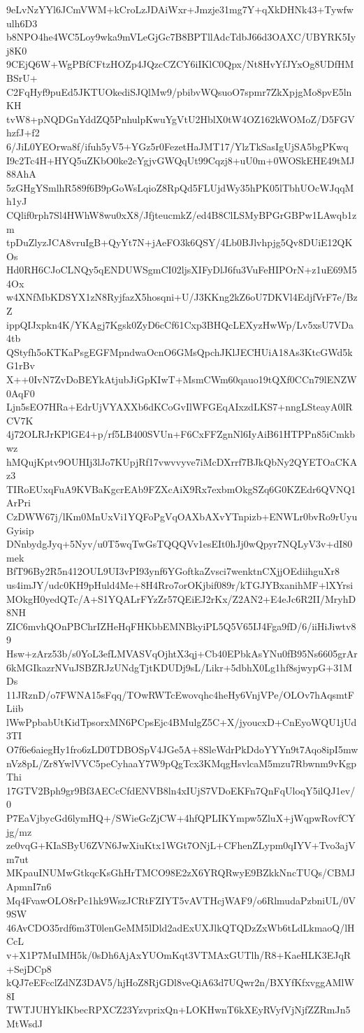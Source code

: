 9eLvNzYYl6JCmVWM+kCroLzJDAiWxr+Jmzje31mg7Y+qXkDHNk43+Tywfwulh6D3
b8NPO4he4WC5Loy9wka9mVLeGjGc7B8BPTllAdcTdbJ66d3OAXC/UBYRK5Iyj8K0
9CEjQ6W+WgPBfCFtzHOZp4JQzcCZCY6iIKlC0Qpx/Nt8HvYfJYxOg8UDfHMBSrU+
C2FqHyf9puEd5JKTUOkediSJQlMw9/pbibvWQsuoO7spmr7ZkXpjgMo8pvE5lnKH
tvW8+pNQDGnYddZQ5PnhulpKwuYgVtU2HblX0tW4OZ162kWOMoZ/D5FGVhzfJ+f2
6/JiL0YEOrwa8f/ifuh5yV5+YGz5r0FezetHaJMT17/YlzTkSasIgUjSA5bgPKwq
I9c2Tc4H+HYQ5uZKbO0ke2cYgjvGWQqUt99Cqzj8+uU0m+0WOSkEHE49tMJ88AhA
5zGHgYSmlhR589f6B9pGoWsLqioZ8RpQd5FLUjdWy35hPK05lTbhUOcWJqqMh1yJ
CQlif0rph7Sl4HWhW8wu0xX8/JfjteucmkZ/ed4B8ClLSMyBPGrGBPw1LAwqb1zm
tpDuZlyzJCA8vruIgB+QyYt7N+jAeFO3k6QSY/4Lb0BJlvhpjg5Qv8DUiE12QKOs
Hd0RH6CJoCLNQy5qENDUWSgmCI02ljsXIFyDlJ6fu3VuFeHIPOrN+z1uE69M54Ox
w4XNfMbKDSYX1zN8RyjfazX5hosqni+U/J3KKng2kZ6oU7DKVl4EdjfVrF7e/BzZ
ippQIJxpkn4K/YKAgj7Kgsk0ZyD6cCf61Cxp3BHQcLEXyzHwWp/Lv5xsU7VDa4tb
QStyfh5oKTKaPsgEGFMpndwaOcnO6GMsQpchJKlJECHUiA18As3KtcGWd5kG1rBv
X++0IvN7ZvDoBEYkAtjubJiGpKIwT+MsmCWm60qauo19tQXf0CCn79lENZW0AqF0
Ljn5sEO7HRa+EdrUjVYAXXb6dKCoGvIlWFGEqAIxzdLKS7+nngLSteayA0lRCV7K
4j72OLRJrKPlGE4+p/rf5LB400SVUn+F6CxFFZgnNl6IyAiB61HTPPn85iCmkbwz
hMQujKptv9OUHIj3lJo7KUpjRf17vwvvyve7iMcDXrrf7BJkQbNy2QYETOaCKAz3
TIRoEUxqFuA9KVBaKgcrEAb9FZXcAiX9Rx7exbmOkgSZq6G0KZEdr6QVNQ1ArPri
CzDWW67j/lKm0MnUxVi1YQFoPgVqOAXbAXvYTnpizb+ENWLr0bvRo9rUyuGyisip
DNnbydgJyq+5Nyv/u0T5wqTwGsTQQQVv1esEIt0hJj0wQpyr7NQLyV3v+dI80mek
BfT96By2R5n412OUL9UI3vPI93ynf6YGoftkaZvsci7wenktnCXjjOEdiihguXr8
us4imJY/udc0KH9pHuld4Me+8H4Rro7orOKjbif089r/kTGJYBxanihMF+lXYrsi
MOkgH0yedQTc/A+S1YQALrFYzZr57QEiEJ2rKx/Z2AN2+E4eJc6R2II/MryhD8NH
ZIC6mvhQOnPBChrIZHeHqFHKbbEMNBkyiPL5Q5V65IJ4Fga9fD/6/iiHiJiwtv89
Hsw+zArz53b/s0YoL3efLMVASVqOjhtX3qj+Cb40EPbkAsYNu0fB95Ns6605grAr
6kMGIkazrNVuJSBZRJzUNdgTjtKDUDj9sL/Likr+5dbhX0Lg1hf8sjwypG+31MDs
11JRznD/o7FWNA15sFqq/TOwRWTcEwovqhc4heHy6VnjVPe/OLOv7hAqsmtFLiib
lWwPpbabUtKidTpsorxMN6PCpsEjc4BMulgZ5C+X/jyoucxD+CnEyoWQU1jUd3TI
O7f6e6aiegHy1fro6zLD0TDBOSpV4JGe5A+8SleWdrPkDdoYYYn9t7Aqo8ipI5mw
nVz8pL/Zr8YwlVVC5peCyhaaY7W9pQgTcx3KMqgHsvlcaM5mzu7Rbwnm9vKgpThi
17GTV2Bph9gr9Bf3AECcCfdENVB8ln4xIUjS7VDoEKFn7QnFqUloqY5ilQJ1ev/0
P7EaVjbycGd6lymHQ+/SWieGcZjCW+4hfQPLIKYmpw5ZluX+jWqpwRovfCYjg/mz
ze0vqG+KIaSByU6ZVN6JwXiuKtx1WGt7ONjL+CFhenZLypm0qIYV+Tvo3ajVm7ut
MKpauINUMwGtkqcKsGhHrTMCO98E2zX6YRQRwyE9BZkkNncTUQs/CBMJApmnI7n6
Mq4FvawOLO8rPc1hk9WszJCRtFZIYT5vAVTHcjWAF9/o6RlmudaPzbniUL/0V9SW
46AvCDO35rdf6m3T0lenGeMM5lDld2adExUXJlkQTQDzZxWb6tLdLkmaoQ/lHCcL
v+X1P7MuIMH5k/0sDh6AjAxYUOmKqt3VTMAxGUTlh/R8+KaeHLK3EJqR+SejDCp8
kQJ7eEFcclZdNZ3DAV5/hjHoZ8RjGDl8veQiA63d7UQwr2n/BXYfKfxvggAMlW8I
TWTJUHYkIKbecRPXCZ23YzvprixQn+LOKHwnT6kXEyRVyfVjNjfZZRmJn5MtWsdJ
